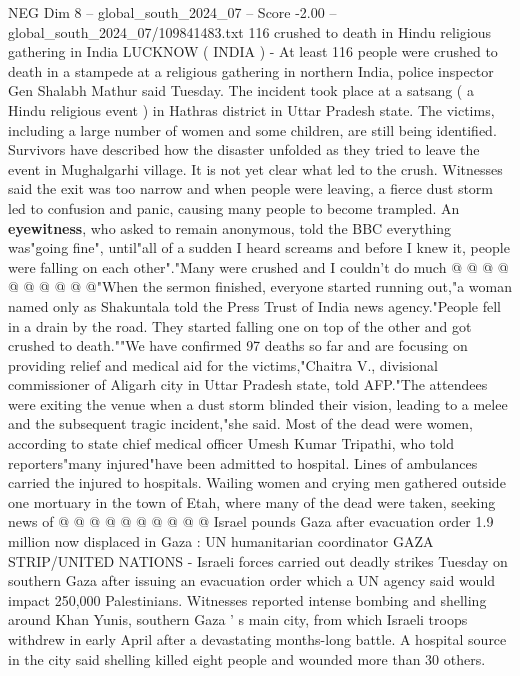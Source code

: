 \begin{textsample}{NEG Dim 8 – global\_south\_2024\_07 – Score -2.00 – global\_south\_2024\_07/109841483.txt}  \label{ex:f8_neg_349}
116 crushed to death in Hindu religious gathering in India LUCKNOW ( INDIA ) - At least 116 people were crushed to death in a stampede at a religious gathering in northern India, police inspector Gen Shalabh Mathur said Tuesday.
The incident took place at a satsang ( a Hindu religious event ) in Hathras district in Uttar Pradesh state.
The victims, including a large number of women and some children, are still being identified.
Survivors have described how the disaster unfolded as they tried to leave the event in Mughalgarhi village.
It is not yet clear what led to the crush.
Witnesses said the exit was too narrow and when people were leaving, a fierce dust storm led to confusion and panic, causing many people to become trampled.
An \textbf{eyewitness}, who asked to remain anonymous, told the BBC everything was"going fine", until"all of a sudden I heard screams and before I knew it, people were falling on each other"."Many were crushed and I couldn't do much @ @ @ @ @ @ @ @ @ @"When the sermon finished, everyone started running out,"a woman named only as Shakuntala told the Press Trust of India news agency."People fell in a drain by the road.
They started falling one on top of the other and got crushed to death.""We have confirmed 97 deaths so far and are focusing on providing relief and medical aid for the victims,"Chaitra V., divisional commissioner of Aligarh city in Uttar Pradesh state, told AFP."The attendees were exiting the venue when a dust storm blinded their vision, leading to a melee and the subsequent tragic incident,"she said.
Most of the dead were women, according to state chief medical officer Umesh Kumar Tripathi, who told reporters"many injured"have been admitted to hospital.
Lines of ambulances carried the injured to hospitals.
Wailing women and crying men gathered outside one mortuary in the town of Etah, where many of the dead were taken, seeking news of @ @ @ @ @ @ @ @ @ @ Israel pounds Gaza after evacuation order 1.9 million now displaced in Gaza : UN humanitarian coordinator GAZA STRIP/UNITED NATIONS - Israeli forces carried out deadly strikes Tuesday on southern Gaza after issuing an evacuation order which a UN agency said would impact 250,000 Palestinians.
Witnesses reported intense bombing and shelling around Khan Yunis, southern Gaza ' s main city, from which Israeli troops withdrew in early April after a devastating months-long battle.
A hospital source in the city said shelling killed eight people and wounded more than 30 others.

\end{textsample}

